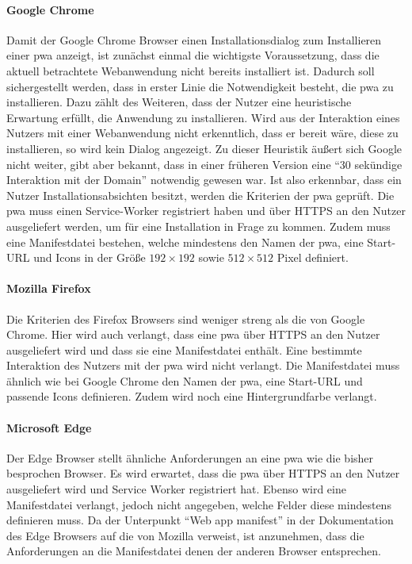 \documentclass[12pt, parskip=half]{scrartcl}       %
\begin{document}
\paragraph{Google Chrome}
Damit der Google Chrome Browser einen Installationsdialog zum Installieren einer \ac{pwa} anzeigt, ist zunächst einmal die wichtigste Voraussetzung, dass die aktuell betrachtete Webanwendung nicht bereits installiert ist.
Dadurch soll sichergestellt werden, dass in erster Linie die Notwendigkeit besteht, die \ac{pwa} zu installieren.
Dazu zählt des Weiteren, dass der Nutzer eine heuristische Erwartung erfüllt, die Anwendung zu installieren.
Wird aus der Interaktion eines Nutzers mit einer Webanwendung nicht erkenntlich, dass er bereit wäre, diese zu installieren, so wird kein Dialog angezeigt.
Zu dieser Heuristik äußert sich Google nicht weiter, gibt aber bekannt, dass in einer früheren Version eine \enquote{30 sekündige Interaktion mit der Domain} notwendig gewesen war.
Ist also erkennbar, dass ein Nutzer Installationsabsichten besitzt, werden die Kriterien der \ac{pwa} geprüft.
Die \ac{pwa} muss einen Service-Worker registriert haben und über HTTPS an den Nutzer ausgeliefert werden, um für eine Installation in Frage zu kommen.
Zudem muss eine Manifestdatei bestehen, welche mindestens den Namen der \ac{pwa}, eine Start-URL und Icons in der Größe $192\times192$ sowie $512\times512$ Pixel definiert.

\paragraph{Mozilla Firefox}
Die Kriterien des Firefox Browsers sind weniger streng als die von Google Chrome.
Hier wird auch verlangt, dass eine \ac{pwa} über HTTPS an den Nutzer ausgeliefert wird und dass sie eine Manifestdatei enthält.
Eine bestimmte Interaktion des Nutzers mit der \ac{pwa} wird nicht verlangt.
Die Manifestdatei muss ähnlich wie bei Google Chrome den Namen der \ac{pwa}, eine Start-URL und passende Icons definieren.
Zudem wird noch eine Hintergrundfarbe verlangt.

\paragraph{Microsoft Edge}
Der Edge Browser stellt ähnliche Anforderungen an eine \ac{pwa} wie die bisher besprochen Browser.
Es wird erwartet, dass die \ac{pwa} über HTTPS an den Nutzer ausgeliefert wird und Service Worker registriert hat.
Ebenso wird eine Manifestdatei verlangt, jedoch nicht angegeben, welche Felder diese mindestens definieren muss.
Da der Unterpunkt \enquote{Web app manifest} in der Dokumentation des Edge Browsers auf die von Mozilla verweist, ist anzunehmen, dass die Anforderungen an die Manifestdatei denen der anderen Browser entsprechen.
\end{document}
